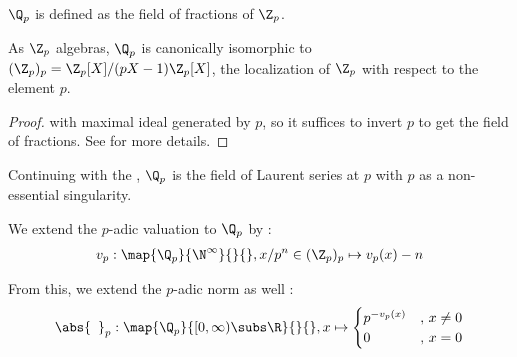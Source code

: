 \begin{dfn}
  
  $\Q_p$ is defined as the field of fractions of $\Z_p$. 
\end{dfn}

\begin{prop}[$\Q_p$ as Localizing $\Z_p$ at $p$]
  
  As $\Z_p$ algebras,
  $\Q_p$ is canonically isomorphic to $(\Z_p)_p = \Z_p[X]/(pX-1)\Z_p[X]$,
  the localization of $\Z_p$ with respect to the element $p$. 
\end{prop}
\begin{proof}
   with 
  maximal ideal generated by $p$, 
  so it suffices to invert $p$ to get the field of fractions. 
  See  for more details. 
\end{proof}

\begin{rmk}[Meaning of $\Q_p$]
  
  Continuing with the , 
  $\Q_p$ is the field of Laurent series at $p$ 
  with $p$ as a non-essential singularity.
\end{rmk}

\begin{dfn}
  
  We extend the $p$-adic valuation to $\Q_p$ by : 
  \begin{align*}
    v_p : \map{\Q_p}{\N^\infty}{}{}, 
    {x}/{p^n} \in (\Z_p)_p \mapsto v_p(x) - n
  \end{align*}

  From this, we extend the $p$-adic norm as well : 
  \begin{align*}
    \abs{\hspace{5pt}}_p : \map{\Q_p}{[0,\infty)\subs \R}{}{}, 
    x \mapsto \begin{cases}
      p^{-v_p(x)} &,\, x \neq 0 \\
      0 &,\, x = 0
    \end{cases}
  \end{align*}
\end{dfn}

